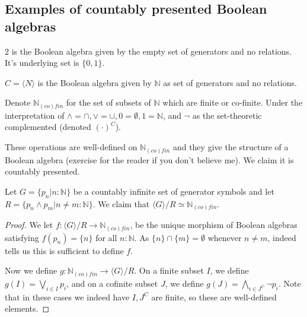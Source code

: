 \documentclass{../util/zariski-small}
\begin{document}
\subsection{Examples of countably presented Boolean algebras}
\begin{example}
  $2$ is the Boolean algebra given by the empty set of generators and no relations. 
    It's underlying set is $\{0,1\}$. 
\end{example}
\begin{example}
  $C = \langle N \rangle $ is the Boolean algebra given by $\mathbb N$ as set of generators and no relations. 
\end{example}
\begin{example}
  Denote $\mathbb N_{(co)fin}$ for the set of subsets of $\mathbb N$ which are finite or co-finite. 
  Under the interpretation of $\wedge = \cap , \vee = \cup, 0 = \emptyset, 1 = \mathbb N$, and $\neg$ 
  as the set-theoretic complemented (denoted $(\cdot)^C$). 

  These operations are well-defined on $\mathbb N_{(co)fin}$ 
  and they give the structure of a Boolean algebra (exercise for the reader if you don't believe me). 
  We claim it is countably presented. 

  Let $G = \{p_n| n:\mathbb N\} $ be a countably infinite set of generator symbols and let 
  $R = \{ p_n \wedge p_m | n\neq m :\mathbb N \}$. 
  We claim that $\langle G \rangle / R \simeq \mathbb N_{(co)fin}$. 

\begin{proof}
  We let $f:\langle G \rangle / R \to \mathbb N_{(co)fin}$, be the unique morphism of Boolean algebras 
  satisfying $f(p_n) = \{n\}$ for all $n:\mathbb N$. As $\{n\} \cap \{m\} = \emptyset$ whenever $n\neq m$, 
   indeed tells us this is sufficient to define $f$. 

  Now we define $g:\mathbb N_{(co)fin} \to \langle G \rangle / R$. 
  On a finite subset $I$, we define $g(I) = \bigvee_{i\in I} p_i$, 
  and on a cofinite subset $J$, we define $g(J) = \bigwedge _{i \in J^C} \neg p_i$. 
  Note that in these cases we indeed have $I,J^C$ are finite, so these are well-defined elements. 


\end{proof}
\end{example}
\end{document}
